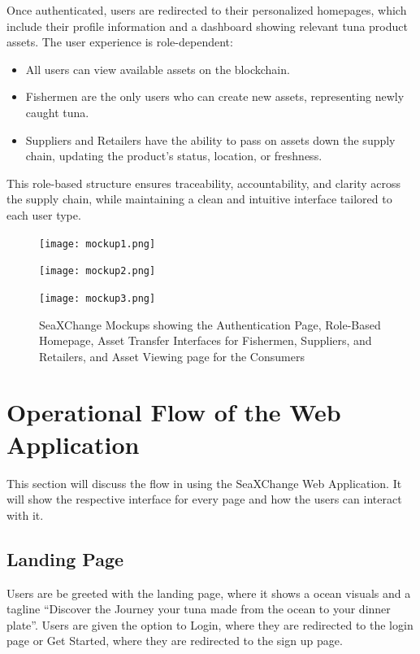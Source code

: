 Once authenticated, users are redirected to their personalized homepages, which include their profile information and a dashboard showing relevant tuna product assets. The user experience is role-dependent:
\begin{itemize}
	\item All users can view available assets on the blockchain.
	\item Fishermen are the only users who can create new assets, representing newly caught tuna.
	\item Suppliers and Retailers have the ability to pass on assets down the supply chain, updating the product's status, location, or freshness.
\end{itemize}
This role-based structure ensures traceability, accountability, and clarity across the supply chain, while maintaining a clean and intuitive interface tailored to each user type.
\begin{figure}[H]
	\centering
	\texttt{[image: mockup1.png]}
	
	\vspace{20pt} %
	
	\texttt{[image: mockup2.png]}
\end{figure}

\clearpage %


\begin{figure}[H]
	\centering
	\texttt{[image: mockup3.png]}
	\caption{SeaXChange Mockups showing the Authentication Page, Role-Based Homepage, Asset Transfer Interfaces for Fishermen, Suppliers, and Retailers, and Asset Viewing page for the Consumers}
	\label{fig:eight_step}
\end{figure}


\section{Operational Flow of the Web Application}
This section will discuss the flow in using the SeaXChange Web Application. It will show the respective interface for every page and how the users can interact with it. 

\subsection{Landing Page}
Users are be greeted with the landing page, where it shows a ocean visuals and a tagline “Discover the Journey your tuna made from the ocean to your dinner plate”. Users are given the option to Login, where they are redirected to the login page or Get Started, where they are redirected to the sign up page. 

